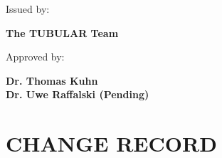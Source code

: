 \documentclass[a4paper,12pt,twoside]{article}
\begin{document}
\begin{flushleft}
\vspace{10pt}

\small
{
Issued by:\\
}

\vspace{0.3cm}

\large
{
\textbf{The TUBULAR Team} \\
}

\vspace{0.3cm}

\small
{
Approved by:\\
}

\vspace{0.3cm}

\large
{
\textbf{Dr. Thomas Kuhn\\Dr. Uwe Raffalski (Pending)}
}
\end{flushleft}




\pagestyle{firstp}
\section*{\small{\textbf{CHANGE RECORD}}}
%
\end{document}
